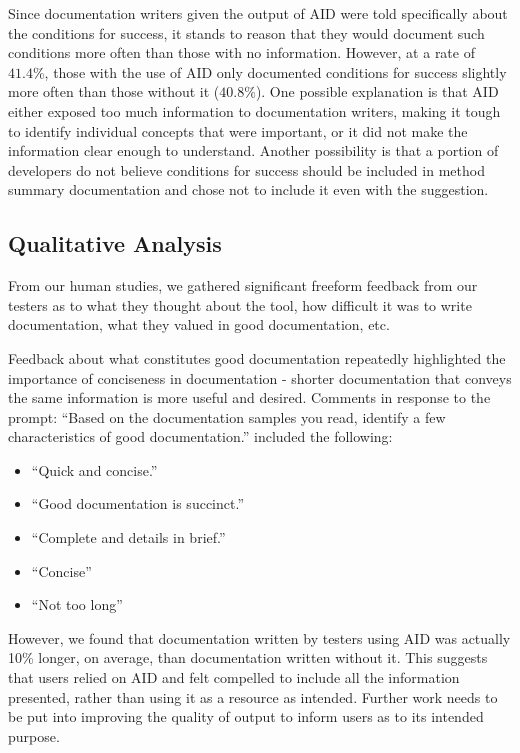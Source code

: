 \documentclass[preprint]{sigplanconf}
\begin{document}
Since documentation writers given the output of AID were told specifically about the conditions for success, it stands to reason that they would document such conditions more often than those with no information. However, at a rate of \(41.4\%\), those with the use of AID only documented conditions for success slightly more often than those without it (\(40.8\%\)). One possible explanation is that AID either exposed too much information to documentation writers, making it tough to identify individual concepts that were important, or it did not make the information clear enough to understand. Another possibility is that a portion of developers do not believe conditions for success should be included in method summary documentation and chose not to include it even with the suggestion.

\subsection{Qualitative Analysis}
From our human studies, we gathered significant freeform feedback from our testers as to what they thought about the tool, how difficult it was to write documentation, what they valued in good documentation, etc.

Feedback about what constitutes good documentation repeatedly highlighted the importance of conciseness in documentation - shorter documentation that conveys the same information is more useful and desired. Comments in response to the prompt: ``Based on the documentation samples you read, identify a few characteristics of good documentation.'' included the following:

\begin{itemize}
\item ``Quick and concise.''
\item ``Good documentation is succinct.''
\item ``Complete and details in brief.''
\item ``Concise''
\item ``Not too long''
\end{itemize}

However, we found that documentation written by testers using AID was actually 10\% longer, on average, than documentation written without it. This suggests that users relied on AID and felt compelled to include all the information presented, rather than using it as a resource as intended. Further work needs to be put into improving the quality of output to inform users as to its intended purpose.
\end{document}
